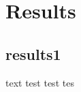 \chapter{Results}\label{chapter:results}

\section{results1}
\label{sec:results1}
text test test tes


